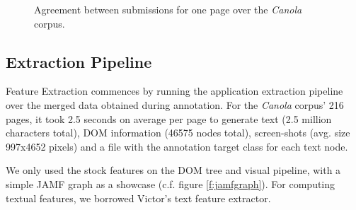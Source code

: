 \begin{figure}[h]
\centering
{}
\label{f:merge}
\caption{Agreement between submissions for one page over the \textit{Canola} corpus.}
\end{figure}


\subsection{Extraction Pipeline}

Feature Extraction commences by running the {\KrdWrd} application extraction pipeline over the merged data obtained during annotation. 
For the \textit{Canola} corpus' 216 pages, it took 2.5 seconds on average per page to generate text (2.5 million characters total), DOM information (46575 nodes total), screen-shots (avg. size 997x4652 pixels) and a file with the annotation target class for each text node.

We only used the stock {\KrdWrd} features on the DOM tree and visual pipeline, with a simple JAMF graph as a showcase (c.f. figure \ref{f:jamfgraph}).
For computing textual features, we borrowed Victor's \cite{spoustamarekpecina2008} text feature extractor.

